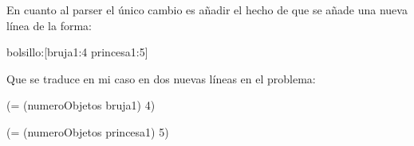 \documentclass[12pt,a4paper]{article}
\begin{document}
En cuanto al parser el único cambio es añadir el hecho de que se añade una nueva línea de la forma:

bolsillo:[bruja1:4 princesa1:5]

Que se traduce en mi caso en dos nuevas líneas en el problema:

(= (numeroObjetos bruja1) 4)

(= (numeroObjetos princesa1) 5)
\end{document}
